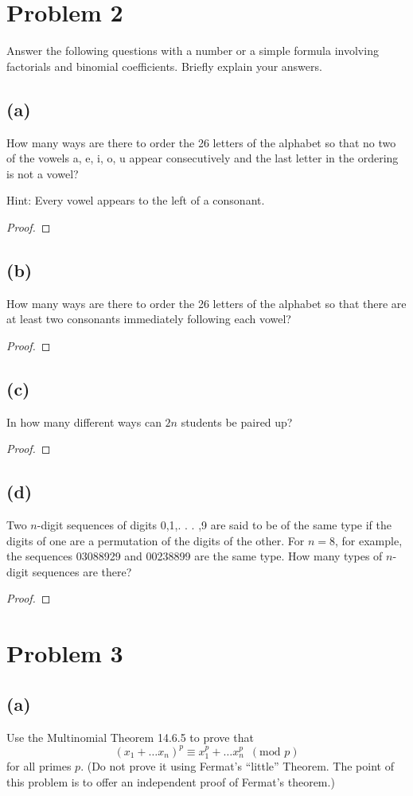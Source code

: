 \documentclass[14pt]{extarticle}
\begin{document}
\section{Problem 2}
Answer the following questions with a number or a simple formula involving factorials and binomial coefficients. Briefly explain your answers.
\subsection{(a)}
How many ways are there to order the 26 letters of the alphabet so that no two of the vowels a, e, i, o, u appear consecutively and the last letter in the ordering is not a vowel?

Hint: Every vowel appears to the left of a consonant.
\begin{proof}
\end{proof}
\subsection{(b)}
How many ways are there to order the 26 letters of the alphabet so that there are at least two consonants immediately following each vowel?
\begin{proof}
\end{proof}
\subsection{(c)}
In how many different ways can $2n$ students be paired up?
\begin{proof}
\end{proof}
\subsection{(d)}
Two $n$-digit sequences of digits 0,1,. . . ,9 are said to be of the same type if the digits of one are a permutation of the digits of the other. For $n = 8$, for example, the sequences 03088929 and 00238899 are the same type. How many types of $n$-digit sequences are there?
\begin{proof}
\end{proof}

\section{Problem 3}
\subsection{(a)}
Use the Multinomial Theorem 14.6.5 to prove that
$$
(x_1 + \ldots x_n)^p \equiv x_1^p + \ldots x_n^p \,\,\,(\text{mod}\,\,p)
$$
for all primes $p$. (Do not prove it using Fermat’s “little” Theorem. The point of this problem is to offer an independent proof of Fermat’s theorem.)
\end{document}
